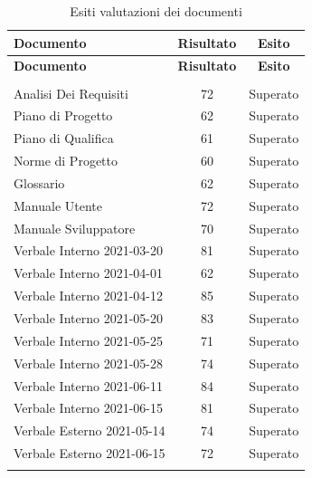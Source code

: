 \documentclass[../piano_di_qualifica.tex]{subfiles}
\begin{document}
\begin{center}
	\begin{longtable}{|l|c|c|}
		\hline
		\rowcolor{lightgray}
		\textbf{Documento}         & \textbf{Risultato} & \textbf{Esito} \\
		\hline
		\endfirsthead

		\hline
		\rowcolor{lightgray}
		\textbf{Documento}         & \textbf{Risultato} & \textbf{Esito} \\
		\hline
		\endhead

		\hline
		\rowcolor{white}
		\multicolumn{3}{|c|}{\emph{Continua alla pagina successiva...}}  \\
		\hline
		\endfoot
		\endlastfoot

		Analisi Dei Requisiti      & 72                 & Superato       \\
		Piano di Progetto          & 62                 & Superato       \\
		Piano di Qualifica         & 61                 & Superato       \\
		Norme di Progetto          & 60                 & Superato       \\
		Glossario                  & 62                 & Superato       \\
		Manuale Utente             & 72                 & Superato       \\
		Manuale Sviluppatore       & 70                 & Superato       \\
		Verbale Interno 2021-03-20 & 81                 & Superato       \\
		Verbale Interno 2021-04-01 & 62                 & Superato       \\
		Verbale Interno 2021-04-12 & 85                 & Superato       \\
		Verbale Interno 2021-05-20 & 83                 & Superato       \\
		Verbale Interno 2021-05-25 & 71                 & Superato       \\
		Verbale Interno 2021-05-28 & 74                 & Superato       \\
		Verbale Interno 2021-06-11 & 84                 & Superato       \\
		Verbale Interno 2021-06-15 & 81                 & Superato       \\
		Verbale Esterno 2021-05-14 & 74                 & Superato       \\
		Verbale Esterno 2021-06-15 & 72                 & Superato       \\


		\hline
		\rowcolor{white}
		\caption{Esiti valutazioni dei documenti}
	\end{longtable}
\end{center}
\end{document}
